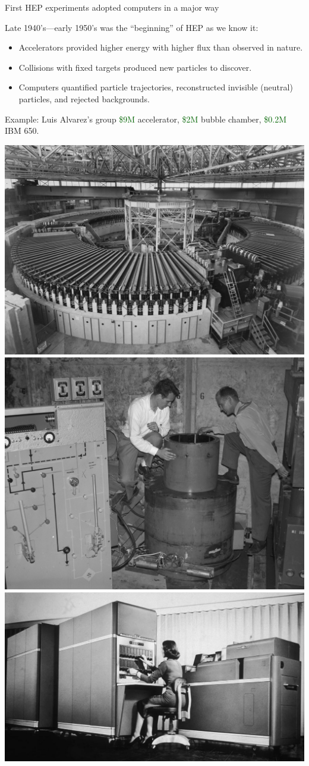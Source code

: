 \documentclass[aspectratio=169]{beamer}
\begin{document}
\begin{frame}{First HEP experiments adopted computers in a major way}
\vspace{0.35 cm}
\large

Late 1940's---early 1950's was the ``beginning'' of HEP as we know it:

\vspace{0.25 cm}
\begin{itemize}
\item Accelerators provided higher energy with higher flux than observed in nature.
\item Collisions with fixed targets produced new particles to discover.
\item Computers quantified particle trajectories, reconstructed invisible (neutral) particles, and rejected backgrounds.
\end{itemize}

\normalsize
\vspace{0.35 cm}
Example: Luis Alvarez's group \textcolor{darkgreen}{\$9M} accelerator, \textcolor{darkgreen}{\$2M} bubble chamber, \textcolor{darkgreen}{\$0.2M} IBM 650.

\vspace{0.25 cm}
\includegraphics[height=3 cm]{img/overall-view-of-bevatron-magnet-photograph-taken-september-6-1955-bevatron-088cb0-1600.jpg}
\hfill \includegraphics[height=3 cm]{img/alvarez-group-bubble-chamber.jpg}
\hfill \includegraphics[height=3 cm]{img/ibm-650.jpg}
\end{frame}
\end{document}
